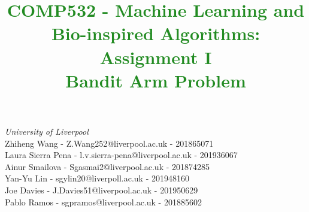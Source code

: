 \documentclass[11pt]{article}
\title{\textcolor{ForestGreen}{\textbf{COMP532 - Machine Learning and Bio-inspired Algorithms: Assignment I \\ Bandit Arm Problem}}}
\begin{document}


\maketitle

\textit{University of Liverpool} \\
\bigskip
 Zhiheng Wang - Z.Wang252@liverpool.ac.uk - 201865071 \\ 
 Laura Sierra Pena - l.v.sierra-pena@liverpool.ac.uk - 201936067 \\ 
 Ainur Smailova - Sgasmai2@liverpool.ac.uk - 201874285 \\ 
 Yan-Yu Lin - sgylin20@liverpoll.ac.uk - 201948160 \\ 
 Joe Davies - J.Davies51@liverpool.ac.uk - 201950629 \\ 
 Pablo Ramos - sgpramos@liverpool.ac.uk - 201885602 \\
\end{document}
